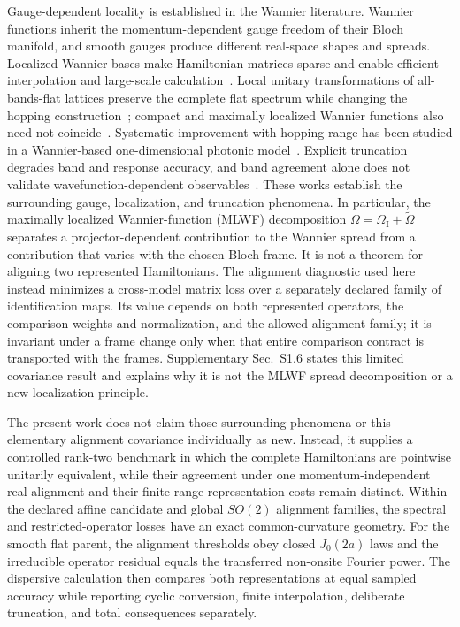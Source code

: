 \documentclass[aps,prb,reprint,amsmath,amssymb,longbibliography,floatfix]{revtex4-2}
\begin{document}
Gauge-dependent locality is established in the Wannier literature. Wannier functions
inherit the momentum-dependent gauge freedom of their Bloch manifold, and smooth gauges
produce different real-space shapes and spreads. Localized Wannier bases make
Hamiltonian matrices sparse and enable efficient interpolation and large-scale
calculation~\cite{marzari1997,souza2001,yates2007,marzari2012,marrazzo2024}. Local unitary transformations of
all-bands-flat lattices preserve the complete flat spectrum while changing the hopping
construction~\cite{danieli2021}; compact and maximally localized Wannier functions also
need not coincide~\cite{sathe2024}. Systematic improvement with hopping range has been
studied in a Wannier-based one-dimensional photonic model~\cite{gupta2022}. Explicit
truncation degrades band and response accuracy, and band agreement alone does not
validate wavefunction-dependent observables~\cite{ghosh2025}. These works establish the surrounding gauge, localization, and truncation phenomena.
In particular, the maximally localized Wannier-function (MLWF) decomposition
$\Omega=\Omega_{\mathrm I}+\widetilde\Omega$ separates a projector-dependent contribution
to the Wannier spread from a contribution that varies with the chosen Bloch frame. It is
not a theorem for aligning two represented Hamiltonians. The alignment diagnostic used
here instead minimizes a cross-model matrix loss over a separately declared family of
identification maps. Its value depends on both represented operators, the comparison
weights and normalization, and the allowed alignment family; it is invariant under a
frame change only when that entire comparison contract is transported with the frames.
Supplementary Sec.~S1.6 states this limited covariance result and explains why it is not
the MLWF spread decomposition or a new localization principle.

The present work does not claim those surrounding phenomena or this elementary
alignment covariance individually as new. Instead, it supplies a controlled rank-two
benchmark in which the complete Hamiltonians are
pointwise unitarily equivalent, while their agreement under one momentum-independent
real alignment and their finite-range representation costs remain distinct. Within the
declared affine candidate and global $SO(2)$ alignment families, the spectral and
restricted-operator losses have an exact common-curvature geometry. For the smooth flat
parent, the alignment thresholds obey closed $J_0(2a)$ laws and the irreducible operator
residual equals the transferred non-onsite Fourier power. The dispersive calculation
then compares both representations at equal sampled accuracy while reporting cyclic
conversion, finite interpolation, deliberate truncation, and total consequences
separately.
\end{document}
